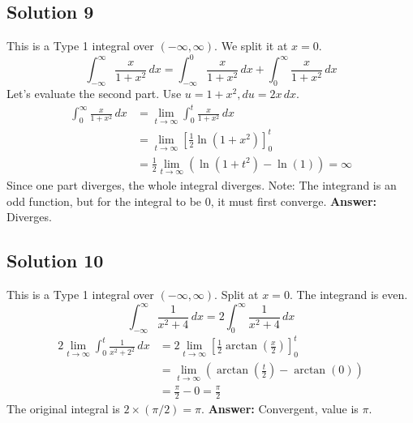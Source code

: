 \documentclass{article}
\begin{document}
\subsection*{Solution 9}
This is a Type 1 integral over $(-\infty, \infty)$. We split it at $x=0$.
\[ \int_{-\infty}^{\infty} \frac{x}{1+x^2} \,dx = \int_{-\infty}^{0} \frac{x}{1+x^2} \,dx + \int_{0}^{\infty} \frac{x}{1+x^2} \,dx \]
Let's evaluate the second part. Use $u=1+x^2, du=2x\,dx$.
\begin{align*}
\int_{0}^{\infty} \frac{x}{1+x^2} \,dx &= \lim_{t \to \infty} \int_{0}^{t} \frac{x}{1+x^2} \,dx \\
&= \lim_{t \to \infty} \left[ \frac{1}{2} \ln(1+x^2) \right]_{0}^{t} \\
&= \frac{1}{2} \lim_{t \to \infty} (\ln(1+t^2) - \ln(1)) = \infty
\end{align*}
Since one part diverges, the whole integral diverges. Note: The integrand is an odd function, but for the integral to be 0, it must first converge.
\textbf{Answer:} Diverges.

\subsection*{Solution 10}
This is a Type 1 integral over $(-\infty, \infty)$. Split at $x=0$. The integrand is even.
\[ \int_{-\infty}^{\infty} \frac{1}{x^2+4} \,dx = 2 \int_{0}^{\infty} \frac{1}{x^2+4} \,dx \]
\begin{align*}
2 \lim_{t \to \infty} \int_{0}^{t} \frac{1}{x^2+2^2} \,dx &= 2 \lim_{t \to \infty} \left[ \frac{1}{2} \arctan\left(\frac{x}{2}\right) \right]_{0}^{t} \\
&= \lim_{t \to \infty} \left( \arctan\left(\frac{t}{2}\right) - \arctan(0) \right) \\
&= \frac{\pi}{2} - 0 = \frac{\pi}{2}
\end{align*}
The original integral is $2 \times (\pi/2) = \pi$.
\textbf{Answer:} Convergent, value is $\pi$.
\end{document}
